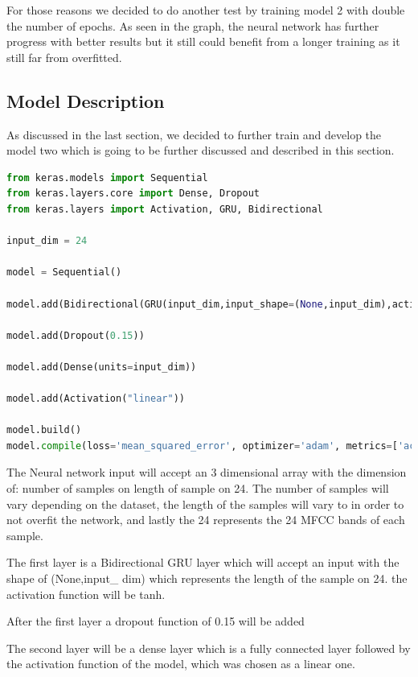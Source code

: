 For those reasons we decided to do another test by training model 2 with double the number of epochs. As seen in the graph, the neural network has further progress with better results but it still could benefit from a longer training as it still far from overfitted.

\subsection{Model Description}

As discussed in the last section, we decided to further train and develop the model two which is going to be further discussed and described in this section.

\begin{lstlisting}[language=Python, caption=Code for the model]
from keras.models import Sequential
from keras.layers.core import Dense, Dropout
from keras.layers import Activation, GRU, Bidirectional

input_dim = 24

model = Sequential()

model.add(Bidirectional(GRU(input_dim,input_shape=(None,input_dim),activation='tanh',return_sequences=True)))

model.add(Dropout(0.15))

model.add(Dense(units=input_dim))

model.add(Activation("linear"))

model.build()
model.compile(loss='mean_squared_error', optimizer='adam', metrics=['accuracy'])
\end{lstlisting}

The Neural network input will accept an 3 dimensional array with the dimension of: number of samples on length of sample on 24.
The number of samples will vary depending on the dataset, the length of the samples will vary to in order to not overfit the network, and lastly the 24 represents the 24 MFCC bands of each sample.


The first layer is a Bidirectional GRU layer which will accept an input with the shape of (None,input\_ dim) which represents the length of the sample on 24.
the activation function will be tanh.

After the first layer a dropout function of 0.15 will be added

The second layer will be a dense layer which is a fully connected layer followed by the activation function of the model, which was chosen as a linear one.

